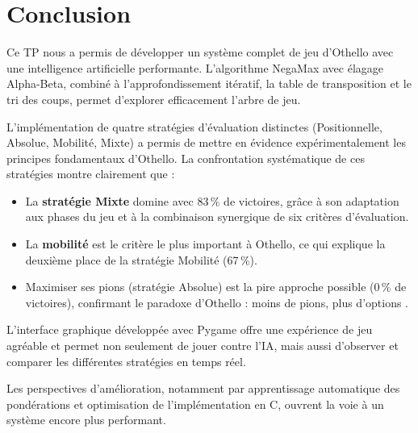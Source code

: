 \documentclass[12pt, a4paper]{article}
\begin{document}
\section{Conclusion}

Ce TP nous a permis de développer un système complet de jeu d'Othello avec une intelligence artificielle performante. L'algorithme NegaMax avec élagage Alpha-Beta, combiné à l'approfondissement itératif, la table de transposition et le tri des coups, permet d'explorer efficacement l'arbre de jeu.

L'implémentation de quatre stratégies d'évaluation distinctes (Positionnelle, Absolue, Mobilité, Mixte) a permis de mettre en évidence expérimentalement les principes fondamentaux d'Othello. La confrontation systématique de ces stratégies montre clairement que :

\begin{itemize}
    \item La \textbf{stratégie Mixte} domine avec 83\,\% de victoires, grâce à son adaptation aux phases du jeu et à la combinaison synergique de six critères d'évaluation.
    \item La \textbf{mobilité} est le critère le plus important à Othello, ce qui explique la deuxième place de la stratégie Mobilité (67\,\%).
    \item Maximiser ses pions (stratégie Absolue) est la pire approche possible (0\,\% de victoires), confirmant le paradoxe d'Othello : \og moins de pions, plus d'options \fg{}.
\end{itemize}

L'interface graphique développée avec Pygame offre une expérience de jeu agréable et permet non seulement de jouer contre l'IA, mais aussi d'observer et comparer les différentes stratégies en temps réel.

Les perspectives d'amélioration, notamment par apprentissage automatique des pondérations et optimisation de l'implémentation en C, ouvrent la voie à un système encore plus performant.
\end{document}
